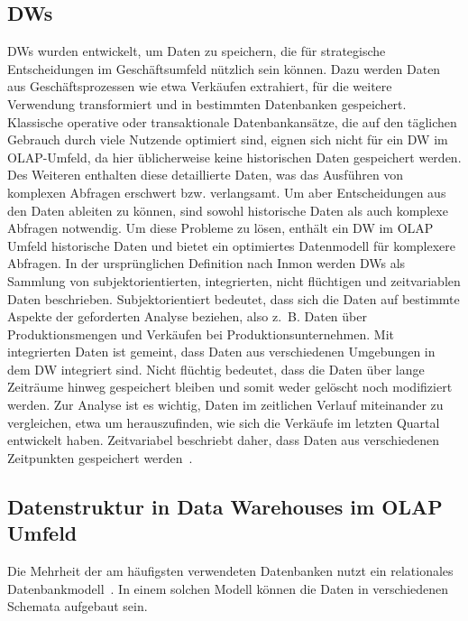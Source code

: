 \subsection{\acfp{DW}}
\acp{DW} wurden entwickelt, um Daten zu speichern, die für strategische Entscheidungen im Geschäftsumfeld nützlich sein können.
Dazu werden Daten aus Geschäftsprozessen wie etwa Verkäufen extrahiert, für die weitere Verwendung transformiert und in bestimmten Datenbanken gespeichert.
Klassische  operative oder transaktionale Datenbankansätze, die auf den täglichen Gebrauch durch viele Nutzende optimiert sind, eignen sich nicht für ein \ac{DW} im \ac{OLAP}-Umfeld, da hier üblicherweise keine historischen Daten gespeichert werden.
Des Weiteren enthalten diese detaillierte Daten, was das Ausführen von komplexen Abfragen erschwert bzw. verlangsamt.
Um aber Entscheidungen aus den Daten ableiten zu können, sind sowohl historische Daten als auch komplexe Abfragen notwendig.
Um diese Probleme zu lösen, enthält ein \ac{DW} im \ac{OLAP} Umfeld historische Daten und bietet ein optimiertes Datenmodell für komplexere Abfragen.
In der ursprünglichen Definition nach Inmon werden \acp{DW} als Sammlung von subjektorientierten, integrierten, nicht flüchtigen und zeitvariablen Daten beschrieben. %
Subjektorientiert bedeutet, dass sich die Daten auf bestimmte Aspekte der geforderten Analyse beziehen, also z.~B. Daten über Produktionsmengen und Verkäufen bei Produktionsunternehmen.
Mit integrierten Daten ist gemeint, dass Daten aus verschiedenen Umgebungen in dem \ac{DW} integriert sind.
Nicht flüchtig bedeutet, dass die Daten über lange Zeiträume hinweg gespeichert bleiben und somit weder gelöscht noch modifiziert werden.
Zur Analyse ist es wichtig, Daten im zeitlichen Verlauf miteinander zu vergleichen, etwa um herauszufinden, wie sich die Verkäufe im letzten Quartal entwickelt haben.
Zeitvariabel beschriebt daher, dass Daten aus verschiedenen Zeitpunkten gespeichert werden~\cite[S.~3f]{vaisman_data_2022}.

\subsection{Datenstruktur in Data Warehouses im \ac{OLAP} Umfeld}
Die Mehrheit der am häufigsten verwendeten Datenbanken nutzt ein relationales Datenbankmodell~\cite{db-engines_most_2023}. 
In einem solchen Modell können die Daten in verschiedenen Schemata aufgebaut sein.

